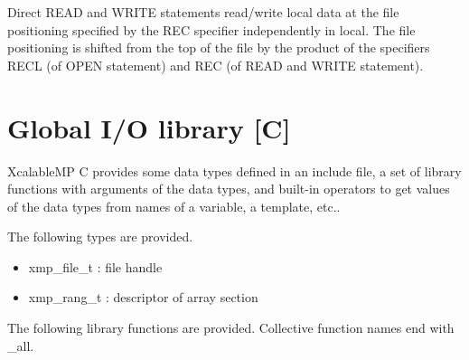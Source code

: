    Direct READ and WRITE statements read/write local data at the file positioning
   specified by the REC specifier independently in local.
   The file positioning is shifted from the top of the file by the product 
   of the specifiers RECL (of OPEN statement) and
   REC (of READ and WRITE statement). 


   \section{Global I/O library [C]}

   XcalableMP C provides some data types defined in an include file, 
   a set of library functions with arguments of the data types, and
   built-in operators to get values of the data types from names of a variable, a template, etc..

   The following types are provided.

   \begin{itemize}
    \item xmp\_file\_t : file handle
    \item xmp\_rang\_t : descriptor of array section
   \end{itemize}

   The following library functions are provided.
   Collective function names end with \_all.

